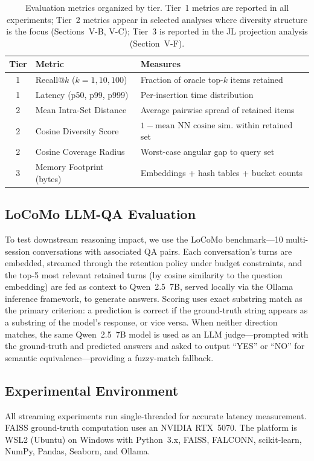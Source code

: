 \documentclass[conference]{IEEEtran}
\begin{document}
\begin{table}[h]
\centering
\caption{Evaluation metrics organized by tier. Tier~1 metrics are
reported in all experiments; Tier~2 metrics appear in selected
analyses where diversity structure is the focus (Sections~V-B, V-C);
Tier~3 is reported in the JL projection analysis (Section~V-F).}
\label{tab:metrics}
\begin{tabular}{@{}clp{3.8cm}@{}}
\toprule
Tier & Metric & Measures \\
\midrule
1 & Recall@$k$ ($k{=}1,10,100$) & Fraction of oracle top-$k$ items retained \\
1 & Latency (p50, p99, p999) & Per-insertion time distribution \\
2 & Mean Intra-Set Distance & Average pairwise spread of retained items \\
2 & Cosine Diversity Score & $1 - \text{mean NN cosine sim.}$ within retained set \\
2 & Cosine Coverage Radius & Worst-case angular gap to query set \\
3 & Memory Footprint (bytes) & Embeddings + hash tables + bucket counts \\
\bottomrule
\end{tabular}
\end{table}

\subsection{LoCoMo LLM-QA Evaluation}
To test downstream reasoning impact, we use the LoCoMo
benchmark---10 multi-session conversations with associated QA pairs.
Each conversation's turns are embedded, streamed through the retention
policy under budget constraints, and the top-5 most relevant retained
turns (by cosine similarity to the question embedding) are fed as
context to Qwen~2.5~7B, served locally via the Ollama inference
framework, to generate answers.
Scoring uses exact substring match as the primary criterion: a
prediction is correct if the ground-truth string appears as a substring
of the model's response, or vice versa. When neither direction matches,
the same Qwen~2.5~7B model is used as an LLM judge---prompted with
the ground-truth and predicted answers and asked to output ``YES'' or
``NO'' for semantic equivalence---providing a fuzzy-match fallback.

\subsection{Experimental Environment}
All streaming experiments run single-threaded for accurate latency
measurement. FAISS ground-truth computation uses an NVIDIA RTX~5070.
The platform is WSL2 (Ubuntu) on Windows with Python~3.x, FAISS,
FALCONN, scikit-learn, NumPy, Pandas, Seaborn, and Ollama.
\end{document}
